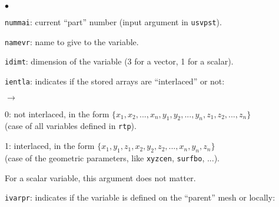 {{{\begin{list}{$\bullet$}{}
       \item \texttt{nummai}: current ``part'' number (input
             argument in \texttt{usvpst}).
       \item \texttt{namevr}: name to give to the variable.
       \item \texttt{idimt}: dimension of the variable (3 for a vector, 1 for
             a scalar).
       \item \texttt{ientla}: indicates if the stored arrays are
             ``interlaced'' or not:
        \begin{list}{$\rightarrow$}{}
               \item 0: not interlaced, in the form ${\{x_1, x_2, ..., x_n,
                         y_1, y_2, ..., y_n, z_1, z_2, ..., z_n\}}$ \\
                         (case of all variables defined in \texttt{rtp}).
               \item 1: interlaced, in the form ${\{x_1, y_1, z_1, x_2, y_2, z_2, ..., x_n, y_n, z_n\}}$ \\
                         (case of the geometric parameters, like
                     \texttt{xyzcen}, \texttt{surfbo}, ...).
         \end{list}
              For a scalar variable, this argument does not matter.
       \item \texttt{ivarpr}: indicates if the variable is defined on the
             ``parent'' mesh or locally:
\end{list}}}}
